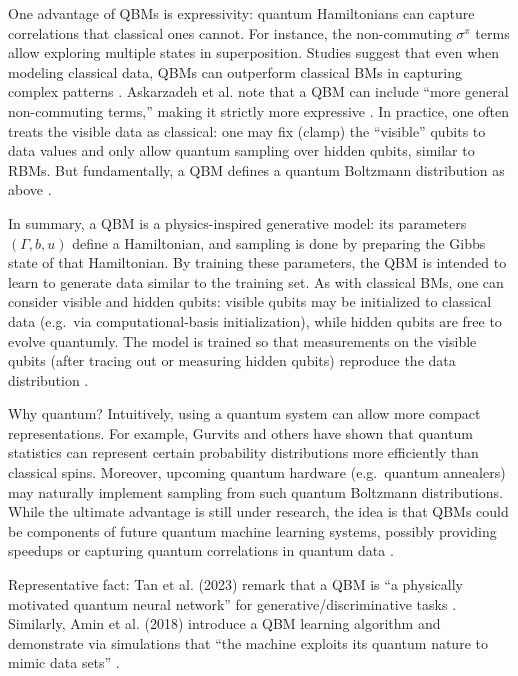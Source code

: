 One advantage of QBMs is expressivity: quantum Hamiltonians can capture correlations that classical ones cannot. For instance, the non-commuting $\sigma^x$ terms allow exploring multiple states in superposition. Studies suggest that even when modeling classical data, QBMs can outperform classical BMs in capturing complex patterns .  Askarzadeh et al. note that a QBM can include “more general non-commuting terms,” making it strictly more expressive .  In practice, one often treats the visible data as classical: one may fix (clamp) the “visible” qubits to data values and only allow quantum sampling over hidden qubits, similar to RBMs. But fundamentally, a QBM defines a quantum Boltzmann distribution as above .



In summary, a QBM is a physics-inspired generative model: its parameters $(\Gamma, b, u)$ define a Hamiltonian, and sampling is done by preparing the Gibbs state of that Hamiltonian. By training these parameters, the QBM is intended to learn to generate data similar to the training set.  As with classical BMs, one can consider visible and hidden qubits: visible qubits may be initialized to classical data (e.g.\ via computational-basis initialization), while hidden qubits are free to evolve quantumly.  The model is trained so that measurements on the visible qubits (after tracing out or measuring hidden qubits) reproduce the data distribution .



Why quantum?  Intuitively, using a quantum system can allow more compact representations.  For example, Gurvits and others have shown that quantum statistics can represent certain probability distributions more efficiently than classical spins.  Moreover, upcoming quantum hardware (e.g.\ quantum annealers) may naturally implement sampling from such quantum Boltzmann distributions.  While the ultimate advantage is still under research, the idea is that QBMs could be components of future quantum machine learning systems, possibly providing speedups or capturing quantum correlations in quantum data .



Representative fact:  Tan et al. (2023) remark that a QBM is “a physically motivated quantum neural network” for generative/discriminative tasks . Similarly, Amin et al. (2018) introduce a QBM learning algorithm and demonstrate via simulations that “the machine exploits its quantum nature to mimic data sets” .



